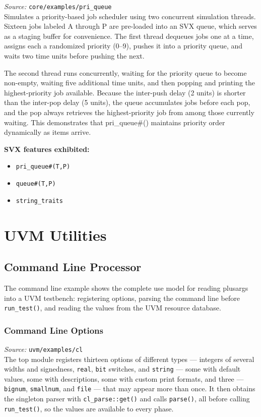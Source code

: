 \documentclass[11pt,letterpaper]{report}
\begin{document}
\textit{Source:} \texttt{core/examples/pri\_queue}\\

Simulates a priority-based job scheduler using two concurrent simulation threads. Sixteen jobs labeled A through P are pre-loaded into an SVX queue, which serves as a staging buffer for convenience. The first thread dequeues jobs one at a time, assigns each a randomized priority (0--9), pushes it into a priority queue, and waits two time units before pushing the next.

The second thread runs concurrently, waiting for the priority queue to become non-empty, waiting five additional time units, and then popping and printing the highest-priority job available. Because the inter-push delay (2 units) is shorter than the inter-pop delay (5 units), the queue accumulates jobs before each pop, and the pop always retrieves the highest-priority job from among those currently waiting. This demonstrates that pri\_queue\#() maintains priority order dynamically as items arrive.

\textbf{SVX features exhibited:}

\begin{itemize}
  \item \texttt{pri\_queue\#(T,P)}
  \item \texttt{queue\#(T,P)}
  \item \texttt{string\_traits}
\end{itemize}
\part{UVM Utilities}

\chapter{Command Line Processor}

The command line example shows the complete use model for reading plusargs into a UVM testbench: registering options, parsing the command line before \texttt{run\_test()}, and reading the values from the UVM resource database.

\section{Command Line Options}

\textit{Source:} \texttt{uvm/examples/cl}\\

The top module registers thirteen options of different types --- integers of several widths and signedness, \texttt{real}, \texttt{bit} switches, and \texttt{string} --- some with default values, some with descriptions, some with custom print formats, and three --- \texttt{bignum}, \texttt{smallnum}, and \texttt{file} --- that may appear more than once. It then obtains the singleton parser with \texttt{cl\_parse::get()} and calls \texttt{parse()}, all before calling \texttt{run\_test()}, so the values are available to every phase.
\end{document}
